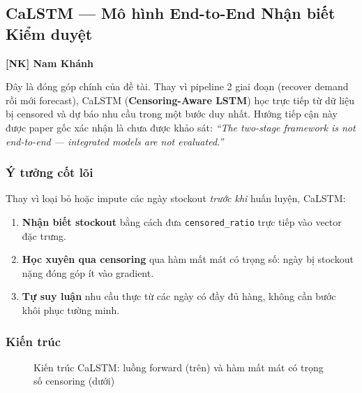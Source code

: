 \documentclass[12pt,a4paper]{report}
\newcommand{\ownerNK}{\colorbox{blue!15}{\textbf{[NK] Nam Khánh}}}
\begin{document}
\subsection{CaLSTM --- Mô hình End-to-End Nhận biết Kiểm duyệt}
\ownerNK

Đây là đóng góp chính của đề tài. Thay vì pipeline 2 giai đoạn (recover demand rồi mới forecast), CaLSTM (\textbf{Censoring-Aware LSTM}) học trực tiếp từ dữ liệu bị censored và dự báo nhu cầu trong một bước duy nhất. Hướng tiếp cận này được paper gốc xác nhận là chưa được khảo sát: \textit{``The two-stage framework is not end-to-end --- integrated models are not evaluated.''} \cite{frn50k2025}

\subsubsection*{Ý tưởng cốt lõi}

Thay vì loại bỏ hoặc impute các ngày stockout \textit{trước khi} huấn luyện, CaLSTM:
\begin{enumerate}
    \item \textbf{Nhận biết stockout} bằng cách đưa \texttt{censored\_ratio} trực tiếp vào vector đặc trưng.
    \item \textbf{Học xuyên qua censoring} qua hàm mất mát có trọng số: ngày bị stockout nặng đóng góp ít vào gradient.
    \item \textbf{Tự suy luận} nhu cầu thực từ các ngày có đầy đủ hàng, không cần bước khôi phục tường minh.
\end{enumerate}

\subsubsection*{Kiến trúc}

\begin{figure}[H]
\centering
{}
\caption{Kiến trúc CaLSTM: luồng forward (trên) và hàm mất mát có trọng số censoring (dưới)}
\end{figure}
\end{document}
